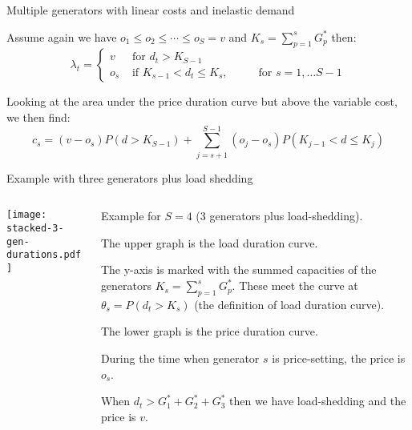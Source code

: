 \documentclass[10pt,aspectratio=169,dvipsnames]{beamer}
\def\l{\lambda}
\begin{document}
\begin{frame}{Multiple generators with linear costs and inelastic demand}

  Assume again we have $o_1 \leq o_2 \leq \cdots \leq o_S = v$ and $K_s = \sum_{p=1}^s G_p^*$
  then:
  \begin{equation*}
    \l_t = \left\{ \begin{array}{ll}
      v& \textrm{ for } d_t > K_{S-1} \\
      o_s & \textrm{ if } K_{s-1} < d_t \leq K_s, \hspace{1cm} \textrm{ for } s = 1, \dots S-1
    \end{array}\right.
  \end{equation*}

  Looking at the area under the price duration curve but above the
  variable cost, we then find:
  \begin{equation*}
    c_s = (v-o_s)P(d>K_{S-1}) + \sum_{j=s+1}^{S-1} (o_j-o_s) P(K_{j-1} < d \leq K_j)
  \end{equation*}


\end{frame}

\begin{frame}{Example with three generators plus load shedding}

\begin{columns}[T]
  \begin{column}{6cm}

\texttt{[image: stacked-3-gen-durations.pdf]}

  \end{column}
  \begin{column}{8cm}
    Example for $S=4$ (3 generators plus load-shedding).

    \vspace{0.5cm}

    The upper graph is the load duration curve.

    The y-axis is marked with the summed capacities of the generators $K_s = \sum_{p=1}^s G_p^*$.
    These meet the curve at $\theta_s = P(d_t > K_s)$ (the definition of load duration curve).

    \vspace{1cm}

    The lower graph is the price duration curve.

    During the time when generator $s$ is price-setting, the price is $o_s$.

    When $d_t > G_1^* + G_2^* + G_3^*$ then we have load-shedding and the price is $v$.
  \end{column}

\end{columns}

\end{frame}
\end{document}
